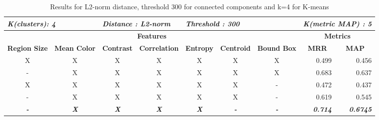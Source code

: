 \begin{table}[H]
\centering
\begin{tabular}{|c|c|c|c|c|c|c|r|r|}
\hline
\multicolumn{2}{|l|}{\textit{\textbf{K(clusters): 4}}} & \multicolumn{2}{l|}{\textit{\textbf{Distance : L2-norm}}} & \multicolumn{3}{l|}{\textit{\textbf{Threshold : 300}}} & \multicolumn{2}{l|}{\textit{\textbf{K(metric MAP) :  5}}} \\ \hline
\multicolumn{7}{|c|}{\textbf{Features}} & \multicolumn{2}{c|}{\textbf{Metrics}} \\ \hline
\textbf{Region Size} & \textbf{Mean Color} & \textbf{Contrast} & \textbf{Correlation} & \textbf{Entropy} & \textbf{Centroid} & \textbf{Bound Box} & \multicolumn{1}{c|}{\textbf{MRR}} & \multicolumn{1}{c|}{\textbf{MAP}} \\ \hline
X & X & X & X & X & X & X & 0.499 & 0.456 \\ \hline
- & X & X & X & X & X & X & 0.683 & 0.637 \\ \hline
X & X & X & X & X & X & - & 0.472 & 0.437 \\ \hline
- & X & X & X & X & X & - & 0.619 & 0.545 \\ \hline
\textit{\textbf{-}} & \textit{\textbf{X}} & \textit{\textbf{X}} & \textit{\textbf{X}} & \textit{\textbf{X}} & \textit{\textbf{-}} & \textit{\textbf{-}} & \textit{\textbf{0.714}} & \textit{\textbf{0.6745}} \\ \hline
\end{tabular}
\caption{Results for L2-norm distance, threshold 300 for connected components and k=4 for K-means}
\label{table:results03}
\end{table}


